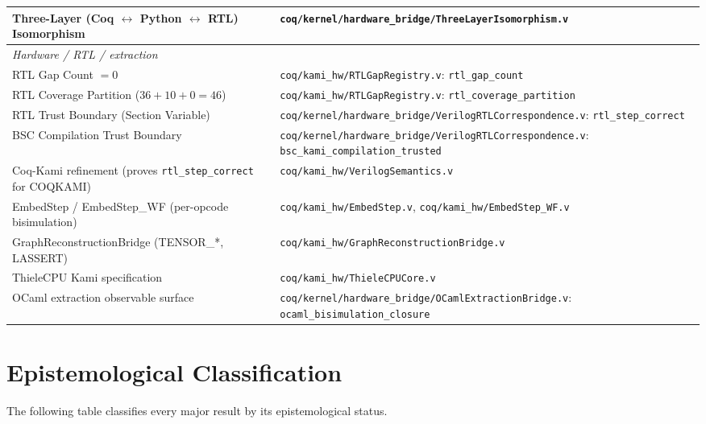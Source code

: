 \documentclass[11pt, a4paper]{report}
\theoremstyle{definition}
\theoremstyle{plain}
\begin{document}
\begin{center}
\begin{tabular}{ll}
Three-Layer (Coq $\leftrightarrow$ Python $\leftrightarrow$ RTL) Isomorphism & \texttt{coq/kernel/hardware\_bridge/ThreeLayerIsomorphism.v} \\
\hline
\multicolumn{2}{l}{\emph{Hardware / RTL / extraction}} \\
\hline
RTL Gap Count $= 0$ & \texttt{coq/kami\_hw/RTLGapRegistry.v}: \texttt{rtl\_gap\_count} \\
RTL Coverage Partition ($36 + 10 + 0 = 46$) & \texttt{coq/kami\_hw/RTLGapRegistry.v}: \texttt{rtl\_coverage\_partition} \\
RTL Trust Boundary (Section Variable) & \texttt{coq/kernel/hardware\_bridge/VerilogRTLCorrespondence.v}: \texttt{rtl\_step\_correct} \\
BSC Compilation Trust Boundary & \texttt{coq/kernel/hardware\_bridge/VerilogRTLCorrespondence.v}: \texttt{bsc\_kami\_compilation\_trusted} \\
Coq-Kami refinement (proves \texttt{rtl\_step\_correct} for COQKAMI) & \texttt{coq/kami\_hw/VerilogSemantics.v} \\
EmbedStep / EmbedStep\_WF (per-opcode bisimulation) & \texttt{coq/kami\_hw/EmbedStep.v}, \texttt{coq/kami\_hw/EmbedStep\_WF.v} \\
GraphReconstructionBridge (TENSOR\_*, LASSERT) & \texttt{coq/kami\_hw/GraphReconstructionBridge.v} \\
ThieleCPU Kami specification & \texttt{coq/kami\_hw/ThieleCPUCore.v} \\
OCaml extraction observable surface & \texttt{coq/kernel/hardware\_bridge/OCamlExtractionBridge.v}: \texttt{ocaml\_bisimulation\_closure} \\
\end{tabular}
\end{center}

\chapter{Epistemological Classification}

The following table classifies every major result by its epistemological status.
\end{document}
